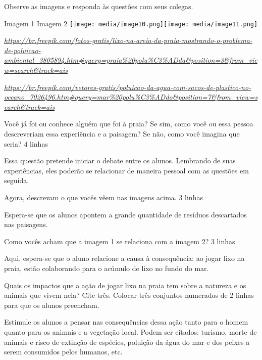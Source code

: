 Observe as imagens e responda às questões com seus colegas.

Imagem 1 Imagem 2
\texttt{[image: media/image10.png]}\texttt{[image: media/image11.png]}

\href{https://br.freepik.com/fotos-gratis/lixo-na-areia-da-praia-mostrando-o-problema-de-poluicao-ambiental_3805894.htm\#query=praia\%20polu\%C3\%ADda\&position=3\&from_view=search\&track=ais}{\emph{https://br.freepik.com/fotos-gratis/lixo-na-areia-da-praia-mostrando-o-problema-de-poluicao-ambiental\_3805894.htm\#query=praia\%20polu\%C3\%ADda\&position=3\&from\_view=search\&track=ais}}

\href{https://br.freepik.com/vetores-gratis/poluicao-da-agua-com-sacos-de-plastico-no-oceano_7026496.htm\#query=mar\%20polu\%C3\%ADdo\&position=7\&from_view=search\&track=ais}{\emph{https://br.freepik.com/vetores-gratis/poluicao-da-agua-com-sacos-de-plastico-no-oceano\_7026496.htm\#query=mar\%20polu\%C3\%ADdo\&position=7\&from\_view=search\&track=ais}}

Você já foi ou conhece alguém que foi à praia? Se sim, como você ou essa
pessoa descreveriam essa experiência e a paisagem? Se não, como você
imagina que seria? 4 linhas

Essa questão pretende iniciar o debate entre os alunos. Lembrando de
suas experiências, eles poderão se relacionar de maneira pessoal com as
questões em seguida.

Agora, descrevam o que vocês vêem nas imagens acima. 3 linhas

Espera-se que os alunos apontem a grande quantidade de resíduos
descartados nas paisagens.

Como vocês acham que a imagem 1 se relaciona com a imagem 2? 3 linhas

Aqui, espera-se que o aluno relacione a causa à consequência: ao jogar
lixo na praia, estão colaborando para o acúmulo de lixo no fundo do mar.

Quais os impactos que a ação de jogar lixo na praia tem sobre a natureza
e os animais que vivem nela? Cite três. Colocar três conjuntos numerados
de 2 linhas para que os alunos preencham.

Estimule os alunos a pensar nas consequências dessa ação tanto para o
homem quanto para os animais e a vegetação local. Podem ser citados:
turismo, morte de animais e risco de extinção de espécies, poluição da
água do mar e dos peixes a serem consumidos pelos humanos, etc.

